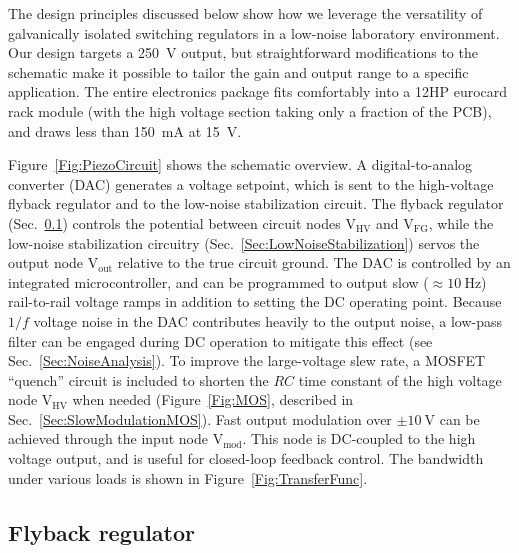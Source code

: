 \documentclass[aip,rsi,reprint]{revtex4-1} %
\begin{document}
The design principles discussed below show how we leverage the versatility of galvanically isolated switching regulators in a low-noise laboratory environment. 
Our design targets a \SI{250}{\volt} output, but straightforward modifications to the schematic make it possible to tailor the gain and output range to a specific application.
The entire electronics package fits comfortably into a 12HP eurocard rack module (with the high voltage section taking only a fraction of the PCB), and draws less than \SI{150}{\milli\ampere} at \SI{15}{\volt}.

Figure~\ref{Fig:PiezoCircuit} shows the schematic overview. 
A digital-to-analog converter (DAC) generates a voltage setpoint, which is sent to the high-voltage flyback regulator and to the low-noise stabilization circuit.
The flyback regulator (Sec.~\ref{Sec:DRV2700}) controls the potential between circuit nodes $\text{V}_\text{HV}$ and $\text{V}_\text{FG}$, while the low-noise stabilization circuitry (Sec.~\ref{Sec:LowNoiseStabilization}) servos the output node $\text{V}_\text{out}$ relative to the true circuit ground.
The DAC is controlled by an integrated microcontroller, and can be programmed to output slow ($\approx\SI{10}{\hertz}$) rail-to-rail voltage ramps in addition to setting the DC operating point.
Because $1/f$ voltage noise in the DAC contributes heavily to the output noise, a low-pass filter can be engaged during DC operation to mitigate this effect (see Sec.~\ref{Sec:NoiseAnalysis}).
To improve the large-voltage slew rate, a MOSFET ``quench'' circuit is included to shorten the $RC$ time constant of the high voltage node $\text{V}_\text{HV}$ when needed (Figure~\ref{Fig:MOS}, described in Sec.~\ref{Sec:SlowModulationMOS}).
Fast output modulation over $\pm\SI{10}{\volt}$ can be achieved through the input node $\text{V}_\text{mod}$.
This node is DC-coupled to the high voltage output, and is useful for closed-loop feedback control.
The bandwidth under various loads is shown in Figure~\ref{Fig:TransferFunc}.



\subsection{Flyback regulator}
\label{Sec:DRV2700}
\end{document}

